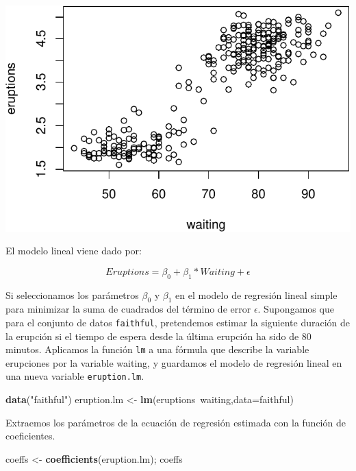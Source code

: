 \documentclass[]{article}
\newenvironment{Shaded}{\begin{snugshade}}{\end{snugshade}}
\newcommand{\KeywordTok}[1]{\textcolor[rgb]{0.13,0.29,0.53}{\textbf{{#1}}}}
\newcommand{\DataTypeTok}[1]{\textcolor[rgb]{0.13,0.29,0.53}{{#1}}}
\newcommand{\StringTok}[1]{\textcolor[rgb]{0.31,0.60,0.02}{{#1}}}
\newcommand{\NormalTok}[1]{{#1}}
\numberwithin{equation}{section}
\begin{document}
\includegraphics{tema6_files/figure-latex/unnamed-chunk-4-1.pdf}

El modelo lineal viene dado por:

\[
Eruptions = \beta_0 + \beta_1*Waiting + \epsilon
\]

Si seleccionamos los parámetros \(\beta_0\) y \(\beta_1\) en el modelo
de regresión lineal simple para minimizar la suma de cuadrados del
término de error \(\epsilon\). Supongamos que para el conjunto de datos
\texttt{faithful}, pretendemos estimar la siguiente duración de la
erupción si el tiempo de espera desde la última erupción ha sido de 80
minutos. Aplicamos la función \texttt{lm} a una fórmula que describe la
variable erupciones por la variable waiting, y guardamos el modelo de
regresión lineal en una nueva variable \texttt{eruption.lm}.

\begin{Shaded}
\begin{Highlighting}[]
\KeywordTok{data}\NormalTok{(}\StringTok{"faithful"}\NormalTok{)}
\NormalTok{eruption.lm <-}\StringTok{ }\KeywordTok{lm}\NormalTok{(eruptions~waiting,}\DataTypeTok{data=}\NormalTok{faithful)}
\end{Highlighting}
\end{Shaded}

Extraemos los parámetros de la ecuación de regresión estimada con la
función de coeficientes.

\begin{Shaded}
\begin{Highlighting}[]
\NormalTok{coeffs <-}\StringTok{ }\KeywordTok{coefficients}\NormalTok{(eruption.lm); coeffs }
\end{Highlighting}
\end{Shaded}
\end{document}
